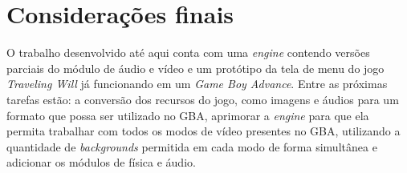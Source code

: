 \chapter[Considerações finais]{Considerações finais}

O trabalho desenvolvido até aqui conta com uma \textit{engine} contendo versões parciais do módulo de áudio e vídeo e um protótipo da tela de menu do jogo \textit{Traveling Will} já funcionando em um \textit{Game Boy Advance}. Entre as próximas tarefas estão: a conversão dos recursos do jogo, como imagens e áudios para um formato que possa ser utilizado no GBA, aprimorar a \textit{engine} para que ela permita trabalhar com todos os modos de vídeo presentes no GBA, utilizando a quantidade de \textit{backgrounds} permitida em cada modo de forma simultânea e adicionar os módulos de física e áudio.
